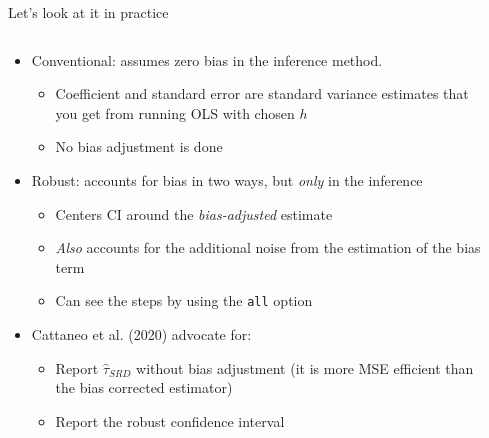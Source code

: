 \documentclass[notes,11pt, aspectratio=169]{beamer}
\begin{document}
\begin{frame}{Let's look at it in practice}
    \begin{columns}[onlytextwidth, T] %
      \begin{column}{.6\textwidth}
        \begin{itemize}
        \item Conventional: assumes zero bias in the inference method.
          \begin{itemize}
          \item Coefficient and standard error are standard variance
            estimates that you get from running OLS with chosen $h$
          \item No bias adjustment is done
          \end{itemize}
        \item Robust: accounts for bias in two ways, but \emph{only} in the inference
          \begin{itemize}
          \item Centers CI around the \emph{bias-adjusted} estimate
          \item \emph{Also} accounts for the additional noise from the estimation of the bias term
          \item Can see the steps by using the \texttt{all} option            
          \end{itemize}
        \item<2-> Cattaneo et al. (2020) advocate for:
          \begin{itemize}
          \item Report $\hat{\tau}_{SRD}$ without bias adjustment (it
            is more MSE efficient than the bias corrected estimator)
          \item Report the robust confidence interval
          \end{itemize}
        \end{itemize}
      \end{column}%
      \hfill%
      \begin{column}{.4\textwidth}

\end{column}
\end{columns}
\end{frame}
\end{document}
